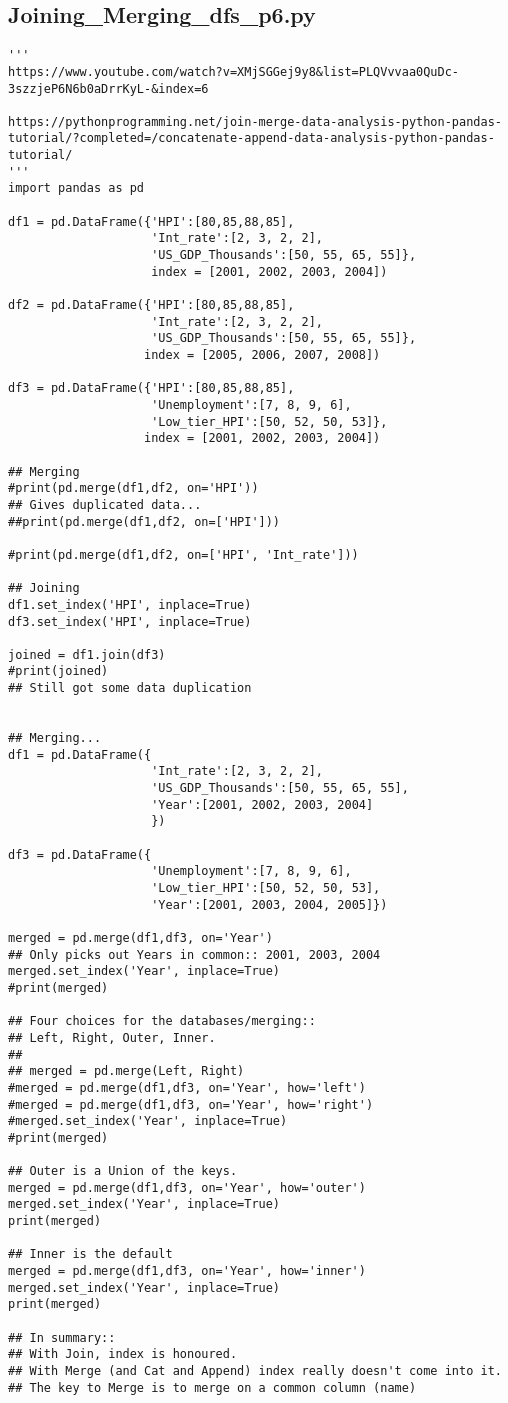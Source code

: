 \documentclass[11pt,a4paper]{article}
\begin{document}
\subsection{Joining\_Merging\_dfs\_p6.py}
\smallskip
\smallskip
\noindent 
\begin{lstlisting}
'''
https://www.youtube.com/watch?v=XMjSGGej9y8&list=PLQVvvaa0QuDc-3szzjeP6N6b0aDrrKyL-&index=6

https://pythonprogramming.net/join-merge-data-analysis-python-pandas-tutorial/?completed=/concatenate-append-data-analysis-python-pandas-tutorial/
'''
import pandas as pd

df1 = pd.DataFrame({'HPI':[80,85,88,85],
                    'Int_rate':[2, 3, 2, 2],
                    'US_GDP_Thousands':[50, 55, 65, 55]},
                    index = [2001, 2002, 2003, 2004])
   
df2 = pd.DataFrame({'HPI':[80,85,88,85],
                    'Int_rate':[2, 3, 2, 2],
                    'US_GDP_Thousands':[50, 55, 65, 55]},
                   index = [2005, 2006, 2007, 2008])

df3 = pd.DataFrame({'HPI':[80,85,88,85],
                    'Unemployment':[7, 8, 9, 6],
                    'Low_tier_HPI':[50, 52, 50, 53]},
                   index = [2001, 2002, 2003, 2004])

## Merging
#print(pd.merge(df1,df2, on='HPI'))
## Gives duplicated data...
##print(pd.merge(df1,df2, on=['HPI']))

#print(pd.merge(df1,df2, on=['HPI', 'Int_rate']))

## Joining
df1.set_index('HPI', inplace=True)
df3.set_index('HPI', inplace=True)

joined = df1.join(df3)
#print(joined)
## Still got some data duplication


## Merging...
df1 = pd.DataFrame({
                    'Int_rate':[2, 3, 2, 2],
                    'US_GDP_Thousands':[50, 55, 65, 55],
                    'Year':[2001, 2002, 2003, 2004]
                    })

df3 = pd.DataFrame({
                    'Unemployment':[7, 8, 9, 6],
                    'Low_tier_HPI':[50, 52, 50, 53],
                    'Year':[2001, 2003, 2004, 2005]})

merged = pd.merge(df1,df3, on='Year')
## Only picks out Years in common:: 2001, 2003, 2004
merged.set_index('Year', inplace=True)
#print(merged)

## Four choices for the databases/merging::
## Left, Right, Outer, Inner.
##
## merged = pd.merge(Left, Right)
#merged = pd.merge(df1,df3, on='Year', how='left')
#merged = pd.merge(df1,df3, on='Year', how='right')
#merged.set_index('Year', inplace=True)
#print(merged)

## Outer is a Union of the keys.
merged = pd.merge(df1,df3, on='Year', how='outer')
merged.set_index('Year', inplace=True)
print(merged)

## Inner is the default
merged = pd.merge(df1,df3, on='Year', how='inner')
merged.set_index('Year', inplace=True)
print(merged)

## In summary::
## With Join, index is honoured.
## With Merge (and Cat and Append) index really doesn't come into it.
## The key to Merge is to merge on a common column (name)
\end{lstlisting}
\end{document}
